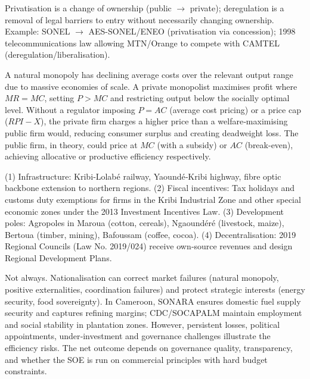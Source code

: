 \documentclass[11pt]{article}
\begin{document}
\begin{corrige}[Exercise 1]
Privatisation is a change of ownership (public $\rightarrow$ private); deregulation is a removal of legal barriers to entry without necessarily changing ownership.  Example: SONEL $\rightarrow$ AES-SONEL/ENEO (privatisation via concession); 1998 telecommunications law allowing MTN/Orange to compete with CAMTEL (deregulation/liberalisation).
\end{corrige}

\begin{corrige}[Exercise 2]
A natural monopoly has declining average costs over the relevant output range due to massive economies of scale.  A private monopolist maximises profit where $MR=MC$, setting $P>MC$ and restricting output below the socially optimal level.  Without a regulator imposing $P=AC$ (average cost pricing) or a price cap ($RPI-X$), the private firm charges a higher price than a welfare‑maximising public firm would, reducing consumer surplus and creating deadweight loss.  The public firm, in theory, could price at $MC$ (with a subsidy) or $AC$ (break-even), achieving allocative or productive efficiency respectively.
\end{corrige}

\begin{corrige}[Exercise 3]
(1) Infrastructure: Kribi‑Lolabé railway, Yaoundé‑Kribi highway, fibre optic backbone extension to northern regions. (2) Fiscal incentives: Tax holidays and customs duty exemptions for firms in the Kribi Industrial Zone and other special economic zones under the 2013 Investment Incentives Law. (3) Development poles: Agropoles in Maroua (cotton, cereals), Ngaoundéré (livestock, maize), Bertoua (timber, mining), Bafoussam (coffee, cocoa). (4) Decentralisation: 2019 Regional Councils (Law No. 2019/024) receive own‑source revenues and design Regional Development Plans.
\end{corrige}

\begin{corrige}[Exercise 4]
Not always.  Nationalisation can correct market failures (natural monopoly, positive externalities, coordination failures) and protect strategic interests (energy security, food sovereignty).  In Cameroon, SONARA ensures domestic fuel supply security and captures refining margins; CDC/SOCAPALM maintain employment and social stability in plantation zones.  However, persistent losses, political appointments, under‑investment and governance challenges illustrate the efficiency risks.  The net outcome depends on governance quality, transparency, and whether the SOE is run on commercial principles with hard budget constraints.
\end{corrige}
\end{document}
